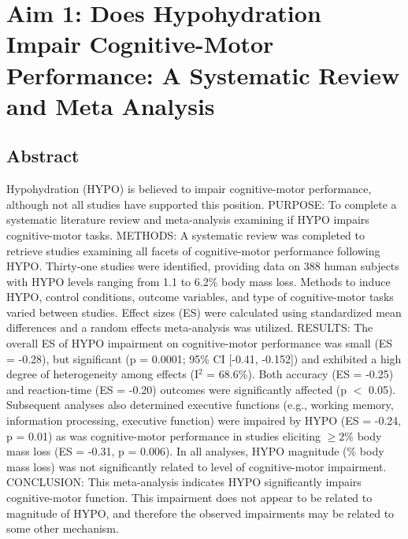 \chapter{Aim 1: Does Hypohydration Impair Cognitive-Motor Performance: A Systematic Review and Meta Analysis}

\section{Abstract}
Hypohydration (HYPO) is believed to impair cognitive-motor performance, although not all studies have supported this position. PURPOSE: To complete a systematic literature review and meta-analysis examining if HYPO impairs cognitive-motor tasks. METHODS: A systematic review was completed to retrieve studies examining all facets of cognitive-motor performance following HYPO. Thirty-one studies were identified, providing data on 388 human subjects with HYPO levels ranging from 1.1 to 6.2\% body mass loss. Methods to induce HYPO, control conditions, outcome variables, and type of cognitive-motor tasks varied between studies. Effect sizes (ES) were calculated using standardized mean differences and a random effects meta-analysis was utilized. RESULTS: The overall ES of HYPO impairment on cognitive-motor performance was small (ES = -0.28), but significant (p = 0.0001; 95\% CI [-0.41, -0.152]) and exhibited a high degree of heterogeneity among effects (I${^2}$ = 68.6\%). Both accuracy (ES = -0.25) and reaction-time (ES = -0.20) outcomes were significantly affected (p $<$ 0.05). Subsequent analyses also determined executive functions (e.g., working memory, information processing, executive function) were impaired by HYPO (ES = -0.24, p = 0.01) as was cognitive-motor performance in studies eliciting ${\geq}$2\% body mass loss (ES = -0.31, p = 0.006). In all analyses, HYPO magnitude (\% body mass loss) was not significantly related to level of cognitive-motor impairment. CONCLUSION: This meta-analysis indicates HYPO significantly impairs cognitive-motor function. This impairment does not appear to be related to magnitude of HYPO, and therefore the observed impairments may be related to some other mechanism.



